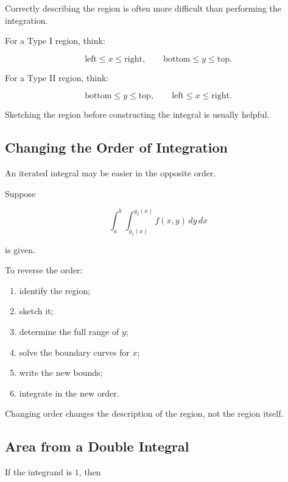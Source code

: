 Correctly describing the region is often more difficult than performing the
integration.

For a Type I region, think:

\[ \boxed{\text{left}\leq x\leq\text{right},
\qquad
\text{bottom}\leq y\leq\text{top}.} \]

For a Type II region, think:

\[ \boxed{\text{bottom}\leq y\leq\text{top},
\qquad
\text{left}\leq x\leq\text{right}.} \]

Sketching the region before constructing the integral is usually helpful.

\subsection{Changing the Order of Integration}
\label{subsec:changing-order-integration}

An iterated integral may be easier in the opposite order.

Suppose

\[ \int_a^b\int_{g_1(x)}^{g_2(x)}f(x,y)\,dy\,dx \]

is given.

To reverse the order:

\begin{enumerate}
    \item identify the region;
    \item sketch it;
    \item determine the full range of \(y\);
    \item solve the boundary curves for \(x\);
    \item write the new bounds;
    \item integrate in the new order.
\end{enumerate}

Changing order changes the description of the region, not the region itself.

\subsection{Area from a Double Integral}
\label{subsec:area-double-integral}

If the integrand is \(1\), then

